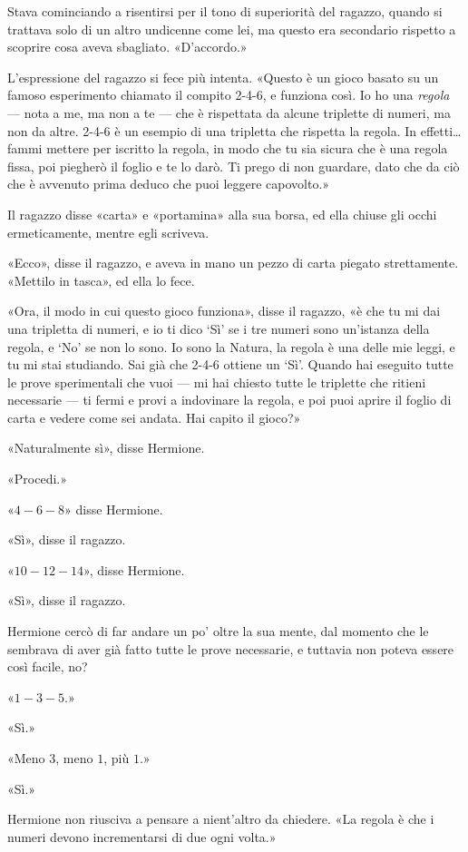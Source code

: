Stava cominciando a risentirsi per il tono di superiorità del ragazzo, quando si trattava solo di un altro undicenne come lei, ma questo era secondario rispetto a scoprire cosa aveva sbagliato. «D’accordo.»

L’espressione del ragazzo si fece più intenta. «Questo è un gioco basato su un famoso esperimento chiamato il compito 2-4-6, e funziona così. Io ho una \textit{regola} — nota a me, ma non a te — che è rispettata da alcune triplette di numeri, ma non da altre. 2-4-6 è un esempio di una tripletta che rispetta la regola. In effetti… fammi mettere per iscritto la regola, in modo che tu sia sicura che è una regola fissa, poi piegherò il foglio e te lo darò. Ti prego di non guardare, dato che da ciò che è avvenuto prima deduco che puoi leggere capovolto.»

Il ragazzo disse «carta» e «portamina» alla sua borsa, ed ella chiuse gli occhi ermeticamente, mentre egli scriveva.

«Ecco», disse il ragazzo, e aveva in mano un pezzo di carta piegato strettamente. «Mettilo in tasca», ed ella lo fece.

«Ora, il modo in cui questo gioco funziona», disse il ragazzo, «è che tu mi dai una tripletta di numeri, e io ti dico ‘Sì’ se i tre numeri sono un’istanza della regola, e ‘No’ se non lo sono. Io sono la Natura, la regola è una delle mie leggi, e tu mi stai studiando. Sai già che 2-4-6 ottiene un ‘Sì’. Quando hai eseguito tutte le prove sperimentali che vuoi — mi hai chiesto tutte le triplette che ritieni necessarie — ti fermi e provi a indovinare la regola, e poi puoi aprire il foglio di carta e vedere come sei andata. Hai capito il gioco?»

«Naturalmente sì», disse Hermione.

«Procedi.»

«$4-6-8$» disse Hermione.

«Sì», disse il ragazzo.

«$10-12-14$», disse Hermione.

«Sì», disse il ragazzo.

Hermione cercò di far andare un po’ oltre la sua mente, dal momento che le sembrava di aver già fatto tutte le prove necessarie, e tuttavia non poteva essere così facile, no?

«$1-3-5$.»

«Sì.»

«Meno $3$, meno $1$, più $1$.»

«Sì.»

Hermione non riusciva a pensare a nient’altro da chiedere. «La regola è che i numeri devono incrementarsi di due ogni volta.»

